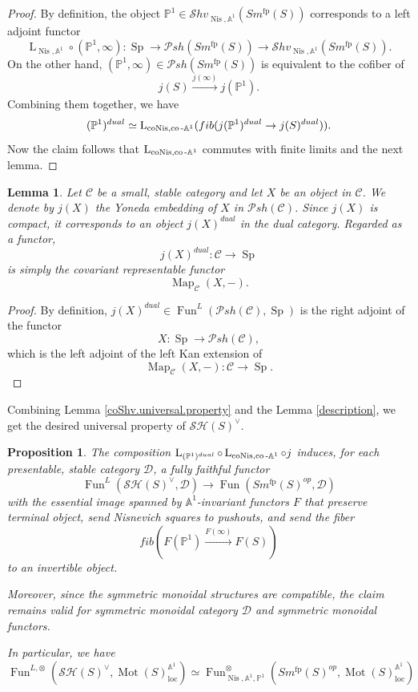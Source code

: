 \documentclass{article}
\newtheorem{lm}[thm]{Lemma}
\newtheorem{prop}[thm]{Proposition}
\theoremstyle{definition}
\newcommand{\on}{\operatorname}
\begin{document}
\begin{proof}
By definition, the object $\mathbb{P}^1\in\mathcal{S}hv_{\on{Nis},\mathbb{A}^1}(Sm^{\on{fp}}(S))$ corresponds to a left adjoint functor\[
\on{L}_{\on{Nis},\mathbb{A}^1}\circ (\mathbb{P}^1,\infty):\on{Sp}\rightarrow\mathcal{P}sh(Sm^{\on{fp}}(S))\rightarrow\mathcal{S}hv_{\on{Nis},\mathbb{A}^1}(Sm^{\on{fp}}(S)).\]
On the other hand, $(\mathbb{P}^1,\infty)\in\mathcal{P}sh(Sm^{\on{fp}}(S))$ is equivalent to the cofiber of\[
j(S)\xrightarrow{j(\infty)}j(\mathbb{P}^1).\]
Combining them together, we have\[
(\mathbb{P}^1)^{dual}\simeq\on{L}_{\on{coNis},\on{co}{\text -}\mathbb{A}^1}(fib(j(\mathbb{P}^1)^{dual}\rightarrow j(S)^{dual})).\]
Now the claim follows that $\on{L}_{\on{coNis},\on{co}{\text -}\mathbb{A}^1}$ commutes with finite limits and the next lemma.
\end{proof}
\begin{lm}
Let $\mathcal{C}$ be a small, stable category and let $X$ be an object in $\mathcal{C}$. We denote by $j(X)$ the Yoneda embedding of $X$ in $\mathcal{P}sh(\mathcal{C})$. Since $j(X)$ is compact, it corresponds to an object $j(X)^{dual}$ in the dual category. Regarded as a functor, \[j(X)^{dual}:\mathcal{C}\rightarrow\on{Sp}\]
is simply the covariant representable functor\[
\on{Map}_{\mathcal{C}}(X,-).\]
\end{lm}
\begin{proof}
By definition, $j(X)^{dual}\in\on{Fun}^L(\mathcal{P}sh(\mathcal{C}),\on{Sp})$ is the right adjoint of the functor\[
X:\on{Sp}\rightarrow\mathcal{P}sh(\mathcal{C}),\]
which is the left adjoint of the left Kan extension of\[
\on{Map}_{\mathcal{C}}(X,-):\mathcal{C}\rightarrow\on{Sp}.\]
\end{proof}
Combining Lemma \ref{coShv.universal.property} and the Lemma \ref{description}, we get the desired universal property of $\mathcal{SH}(S)^\vee$.
\begin{prop}\label{cons}
The composition $\on{L}_{(\mathbb{P}^1)^{dual}}\circ\on{L}_{\on{coNis},\on{co}{\text -}\mathbb{A}^1}\circ j$ induces, for each presentable, stable category $\mathcal{D}$, a fully faithful functor\[
\on{Fun}^L(\mathcal{SH}(S)^\vee,\mathcal{D})\rightarrow\on{Fun}(Sm^{\on{fp}}(S)^{op},\mathcal{D})
\]
with the essential image spanned by $\mathbb{A}^1$-invariant functors $F$ that preserve terminal object, send Nisnevich squares to pushouts, and send the fiber\[fib(F(\mathbb{P}^1)\xrightarrow{F(\infty)}F(S))\]
to an invertible object.


Moreover, since the symmetric monoidal structures are compatible, the claim remains valid for symmetric monoidal category $\mathcal{D}$ and symmetric monoidal functors.


In particular, we have\[\on{Fun}^{L,\otimes}(\mathcal{SH}(S)^\vee,\on{Mot}(S)_{\on{loc}}^{\mathbb{A}^1})\simeq\on{Fun}^{\otimes}_{\on{Nis},\mathbb{A}^1,\mathbb{P}^1}(Sm^{\on{fp}}(S)^{op},\on{Mot}(S)_{\on{loc}}^{\mathbb{A}^1})
\]
\end{prop}
\end{document}
